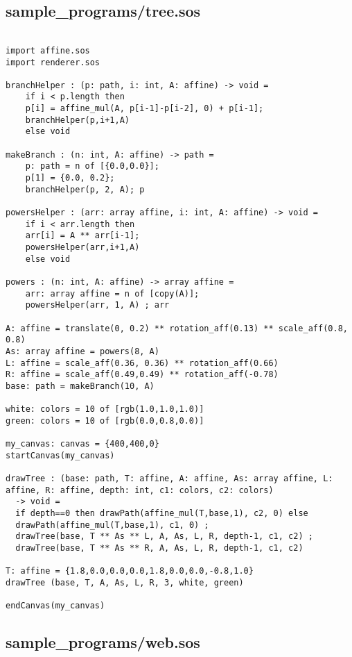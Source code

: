 \documentclass[main.tex]{subfiles}
\begin{document}
\subsection{sample\_programs/tree.sos}

\begin{lstlisting}

import affine.sos
import renderer.sos

branchHelper : (p: path, i: int, A: affine) -> void = 
    if i < p.length then
    p[i] = affine_mul(A, p[i-1]-p[i-2], 0) + p[i-1];
    branchHelper(p,i+1,A)
    else void

makeBranch : (n: int, A: affine) -> path =
    p: path = n of [{0.0,0.0}];
    p[1] = {0.0, 0.2};
    branchHelper(p, 2, A); p

powersHelper : (arr: array affine, i: int, A: affine) -> void = 
    if i < arr.length then
    arr[i] = A ** arr[i-1];
    powersHelper(arr,i+1,A)
    else void

powers : (n: int, A: affine) -> array affine = 
    arr: array affine = n of [copy(A)];
    powersHelper(arr, 1, A) ; arr

A: affine = translate(0, 0.2) ** rotation_aff(0.13) ** scale_aff(0.8, 0.8)
As: array affine = powers(8, A)
L: affine = scale_aff(0.36, 0.36) ** rotation_aff(0.66)
R: affine = scale_aff(0.49,0.49) ** rotation_aff(-0.78)
base: path = makeBranch(10, A)

white: colors = 10 of [rgb(1.0,1.0,1.0)]
green: colors = 10 of [rgb(0.0,0.8,0.0)]

my_canvas: canvas = {400,400,0}
startCanvas(my_canvas)

drawTree : (base: path, T: affine, A: affine, As: array affine, L: affine, R: affine, depth: int, c1: colors, c2: colors)
  -> void = 
  if depth==0 then drawPath(affine_mul(T,base,1), c2, 0) else
  drawPath(affine_mul(T,base,1), c1, 0) ;
  drawTree(base, T ** As ** L, A, As, L, R, depth-1, c1, c2) ;
  drawTree(base, T ** As ** R, A, As, L, R, depth-1, c1, c2)

T: affine = {1.8,0.0,0.0,0.0,1.8,0.0,0.0,-0.8,1.0}
drawTree (base, T, A, As, L, R, 3, white, green)

endCanvas(my_canvas)

\end{lstlisting}

\subsection{sample\_programs/web.sos}
\end{document}
